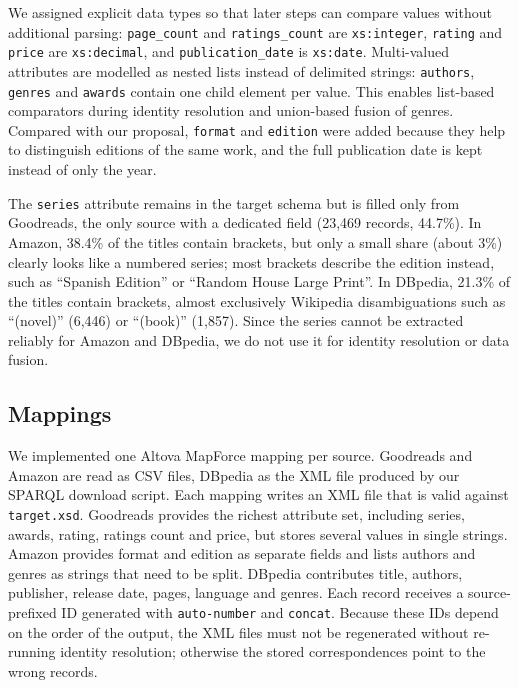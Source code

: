 \documentclass[runningheads]{llncs}
\begin{document}
We assigned explicit data types so that later steps can compare values without
additional parsing: \texttt{page\_count} and \texttt{ratings\_count} are
\texttt{xs:integer}, \texttt{rating} and \texttt{price} are
\texttt{xs:decimal}, and \texttt{publication\_date} is \texttt{xs:date}.
Multi-valued attributes are modelled as nested lists instead of delimited
strings: \texttt{authors}, \texttt{genres} and \texttt{awards} contain one
child element per value. This enables list-based comparators during identity
resolution and union-based fusion of genres. Compared with our proposal,
\texttt{format} and \texttt{edition} were added because they help to
distinguish editions of the same work, and the full publication date is kept
instead of only the year.

The \texttt{series} attribute remains in the target schema but is filled
only from Goodreads, the only source with a dedicated field (23,469
records, 44.7\%). In Amazon, 38.4\% of the titles contain brackets, but only
a small share (about 3\%) clearly looks like a numbered series; most
brackets describe the edition instead, such as ``Spanish Edition'' or
``Random House Large Print''. In DBpedia, 21.3\% of the titles contain
brackets, almost exclusively Wikipedia disambiguations such as ``(novel)''
(6,446) or ``(book)'' (1,857). Since the series cannot be extracted
reliably for Amazon and DBpedia, we do not use it for identity resolution
or data fusion.

\subsection{Mappings}
We implemented one Altova MapForce mapping per source. Goodreads and Amazon
are read as CSV files, DBpedia as the XML file produced by our SPARQL download
script. Each mapping writes an XML file that is valid against
\texttt{target.xsd}. Goodreads provides the richest attribute set, including
series, awards, rating, ratings count and price, but stores several values in
single strings. Amazon provides format and edition as separate fields and
lists authors and genres as strings that need to be split. DBpedia
contributes title, authors, publisher, release date, pages, language and
genres. Each record receives a source-prefixed ID generated with
\texttt{auto-number} and \texttt{concat}. Because these IDs depend on the
order of the output, the XML files must not be regenerated without re-running
identity resolution; otherwise the stored correspondences point to the wrong
records.
\end{document}
